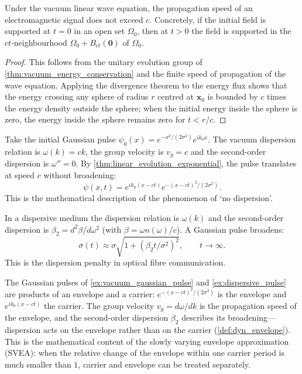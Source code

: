 \begin{corollary}\label{cor:causality_speed}
Under the vacuum linear wave equation, the propagation speed of an electromagnetic signal does not exceed $c$. Concretely, if the initial field is supported at $t=0$ in an open set $\Omega_0$, then at $t>0$ the field is supported in the $ct$-neighbourhood $\Omega_0 + B_{ct}(\mathbf{0})$ of $\Omega_0$.
\end{corollary}

\begin{proof}
This follows from the unitary evolution group of \cref{thm:vacuum_energy_conservation} and the finite speed of propagation of the wave equation. Applying the divergence theorem to the energy flux shows that the energy crossing any sphere of radius $r$ centred at $\mathbf{x}_0$ is bounded by $c$ times the energy density outside the sphere; when the initial energy inside the sphere is zero, the energy inside the sphere remains zero for $t<r/c$.
\end{proof}

\begin{example}\label{ex:vacuum_gaussian_pulse}
Take the initial Gaussian pulse $\psi_0(x) = e^{-x^2/(2\sigma^2)}e^{ik_0x}$. The vacuum dispersion relation is $\omega(k) = ck$, the group velocity is $v_g = c$ and the second-order dispersion is $\omega''=0$. By \cref{thm:linear_evolution_exponential}, the pulse translates at speed $c$ without broadening:
\[
\psi(x,t) = e^{ik_0(x-ct)}e^{-(x-ct)^2/(2\sigma^2)}.
\]
This is the mathematical description of the phenomenon of `no dispersion'.
\end{example}

\begin{example}\label{ex:dispersive_pulse}
In a dispersive medium the dispersion relation is $\omega(k)$ and the second-order dispersion is $\beta_2 = d^2\beta/d\omega^2$ (with $\beta = \omega n(\omega)/c$). A Gaussian pulse broadens:
\[
\sigma(t) \approx \sigma\sqrt{1 + (\beta_2 t/\sigma^2)^2}, \qquad t\to\infty.
\]
This is the dispersion penalty in optical fibre communication.
\end{example}

\begin{remark}\label{rem:pulse_envelope}
The Gaussian pulses of \cref{ex:vacuum_gaussian_pulse} and \cref{ex:dispersive_pulse} are products of an envelope and a carrier: $e^{-(x-ct)^2/(2\sigma^2)}$ is the envelope and $e^{ik_0(x-ct)}$ the carrier. The group velocity $v_g=d\omega/dk$ is the propagation speed of the envelope, and the second-order dispersion $\beta_2$ describes its broadening---dispersion acts on the envelope rather than on the carrier (\cref{def:dyn_envelope}). This is the mathematical content of the slowly varying envelope approximation (SVEA): when the relative change of the envelope within one carrier period is much smaller than $1$, carrier and envelope can be treated separately.
\end{remark}

